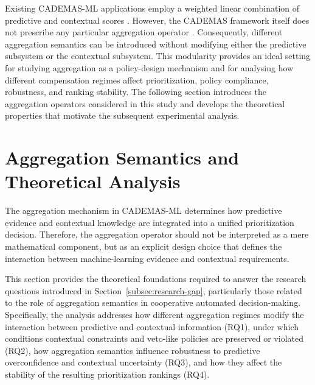 \documentclass[mathematics,article,submit,moreauthors]{Definitions/mdpi}
\begin{document}
Existing CADEMAS-ML applications employ a weighted linear combination of
predictive and contextual scores \citep{Godz2026}. However, the
CADEMAS framework itself does not prescribe any particular aggregation
operator \citep{NovoaHernandez2026}. Consequently, different aggregation
semantics can be introduced without modifying either the predictive
subsystem or the contextual subsystem. This modularity provides an
ideal setting for studying aggregation as a policy-design mechanism and
for analysing how different compensation regimes affect prioritization,
policy compliance, robustness, and ranking stability. The following
section introduces the aggregation operators considered in this study
and develops the theoretical properties that motivate the subsequent
experimental analysis.



%

\section{Aggregation Semantics and Theoretical Analysis}
\label{sect:aggregation-theory}

The aggregation mechanism in CADEMAS-ML determines how predictive
evidence and contextual knowledge are integrated into a unified
prioritization decision. Therefore, the aggregation operator should not
be interpreted as a mere mathematical component, but as an explicit
design choice that defines the interaction between machine-learning
evidence and contextual requirements.

This section provides the theoretical foundations required to answer the
research questions introduced in Section~\ref{subsec:research-gap},
particularly those related to the role of aggregation semantics in
cooperative automated decision-making. {\color{teal}Specifically, the
analysis addresses how}
different aggregation regimes modify the interaction between predictive
and contextual information (RQ1), under which conditions contextual
constraints and veto-like policies are preserved or violated (RQ2), how
aggregation semantics influence robustness to predictive
overconfidence and contextual uncertainty (RQ3), and how they affect the
stability of the resulting prioritization rankings (RQ4).
\end{document}
